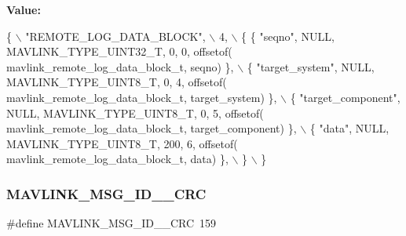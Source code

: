 {\bfseries Value\+:}
\begin{DoxyCode}
\{ \(\backslash\)
    \textcolor{stringliteral}{"REMOTE\_LOG\_DATA\_BLOCK"}, \(\backslash\)
    4, \(\backslash\)
    \{  \{ \textcolor{stringliteral}{"seqno"}, NULL, MAVLINK_TYPE_UINT32_T, 0, 0, offsetof(
      mavlink_remote_log_data_block_t, seqno) \}, \(\backslash\)
         \{ \textcolor{stringliteral}{"target\_system"}, NULL, MAVLINK_TYPE_UINT8_T, 0, 4, offsetof(
      mavlink_remote_log_data_block_t, target\_system) \}, \(\backslash\)
         \{ \textcolor{stringliteral}{"target\_component"}, NULL, MAVLINK_TYPE_UINT8_T, 0, 5, offsetof(
      mavlink_remote_log_data_block_t, target\_component) \}, \(\backslash\)
         \{ \textcolor{stringliteral}{"data"}, NULL, MAVLINK_TYPE_UINT8_T, 200, 6, offsetof(
      mavlink_remote_log_data_block_t, data) \}, \(\backslash\)
         \} \(\backslash\)
\}
\end{DoxyCode}
\mbox{\label{mavlink__msg__remote__log__data__block_8h_a95ea32e0ede2de34ef1f2af583850d32}} 
\subsubsection{M\+A\+V\+L\+I\+N\+K\+\_\+\+M\+S\+G\+\_\+\+I\+D\+\_\+\_\+\+C\+RC}
{\footnotesize\ttfamily \#define M\+A\+V\+L\+I\+N\+K\+\_\+\+M\+S\+G\+\_\+\+I\+D\+\_\+\_\+\+C\+RC~159}

\mbox{\label{mavlink__msg__remote__log__data__block_8h_a9293aa6351a584e1b63438e7ac44ef8f}} 
